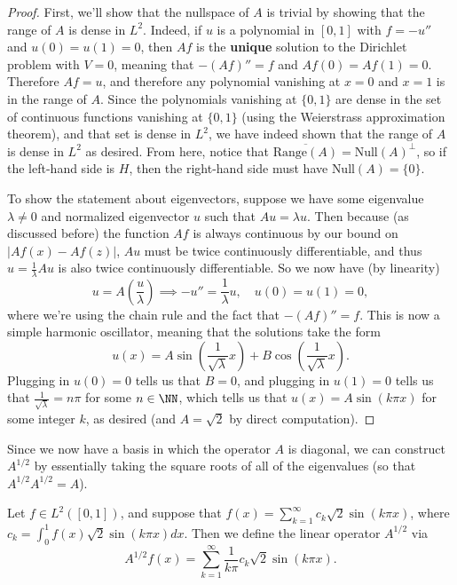 \begin{proof}
First, we'll show that the nullspace of $A$ is trivial by showing that the range of $A$ is dense in $L^2$. Indeed, if $u$ is a polynomial in $[0, 1]$ with $f = -u''$ and $u(0) = u(1) = 0$, then $Af$ is the \textbf{unique} solution to the Dirichlet problem with $V = 0$, meaning that $-(Af)'' = f$ and $Af(0) = Af(1) = 0$. Therefore $Af = u$, and therefore any polynomial vanishing at $x = 0$ and $x = 1$ is in the range of $A$. Since the polynomials vanishing at $\{0, 1\}$ are dense in the set of continuous functions vanishing at $\{0, 1\}$ (using the Weierstrass approximation theorem), and that set is dense in $L^2$, we have indeed shown that the range of $A$ is dense in $L^2$ as desired. From here, notice that $\overline{\text{Range}(A)} = \text{Null}(A)^\perp$, so if the left-hand side is $H$, then the right-hand side must have $\text{Null}(A) = \{0\}$.

To show the statement about eigenvectors, suppose we have some eigenvalue $\lambda \ne 0$ and normalized eigenvector $u$ such that $Au = \lambda u$. Then because (as discussed before) the function $Af$ is always continuous by our bound on $|Af(x) - Af(z)|$, $Au$ must be twice continuously differentiable, and thus $u = \frac{1}{\lambda} Au$ is also twice continuously differentiable. So we now have (by linearity)
\[
    u = A\left(\frac{u}{\lambda}\right) \implies -u'' = \frac{1}{\lambda} u, \quad u(0) = u(1) = 0,
\]
where we're using the chain rule and the fact that $-(Af)'' = f$. This is now a simple harmonic oscillator, meaning that the solutions take the form 
\[
    u(x) = A \sin \left(\frac{1}{\sqrt{\lambda}} x\right) + B \cos\left(\frac{1}{\sqrt{\lambda}} x\right).
\]
Plugging in $u(0) = 0$ tells us that $B = 0$, and plugging in $u(1) = 0$ tells us that $\frac{1}{\sqrt{\lambda}} = n\pi$ for some $n \in \NN$, which tells us that $u(x) = A \sin(k \pi x)$ for some integer $k$, as desired (and $A = \sqrt{2}$ by direct computation). 
\end{proof}

Since we now have a basis in which the operator $A$ is diagonal, we can construct $A^{1/2}$ by essentially taking the square roots of all of the eigenvalues (so that $A^{1/2}A^{1/2} = A$). 

\begin{definition}
Let $f \in L^2([0, 1])$, and suppose that $f(x) = \sum_{k=1}^{\infty} c_k \sqrt{2} \sin(k \pi x)$, where $c_k = \int_0^1 f(x) \sqrt{2} \sin (k \pi x) dx$. Then we define the linear operator $A^{1/2}$ via
\[
    A^{1/2}f(x) = \sum_{k=1}^{\infty} \frac{1}{k\pi} c_k \sqrt{2} \sin (k\pi x).
\]
\end{definition}

